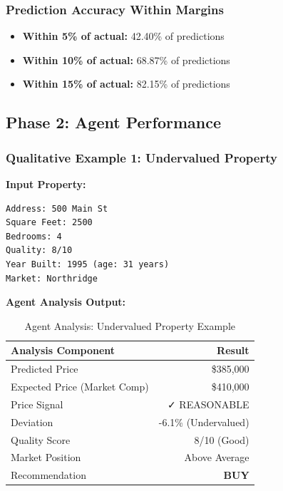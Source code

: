 \documentclass[11pt,a4paper]{article}
\begin{document}
\subsubsection{Prediction Accuracy Within Margins}

\begin{itemize}
    \item \textbf{Within 5\% of actual:} 42.40\% of predictions
    \item \textbf{Within 10\% of actual:} 68.87\% of predictions
    \item \textbf{Within 15\% of actual:} 82.15\% of predictions
\end{itemize}

\subsection{Phase 2: Agent Performance}

\subsubsection{Qualitative Example 1: Undervalued Property}

\textbf{Input Property:}
\begin{lstlisting}
Address: 500 Main St
Square Feet: 2500
Bedrooms: 4
Quality: 8/10
Year Built: 1995 (age: 31 years)
Market: Northridge
\end{lstlisting}

\textbf{Agent Analysis Output:}

\begin{table}[h!]
    \centering
    \small
    \begin{tabular}{lr}
        \toprule
        \textbf{Analysis Component} & \textbf{Result} \\
        \midrule
        Predicted Price & \$385,000 \\
        Expected Price (Market Comp) & \$410,000 \\
        Price Signal & ✓ REASONABLE \\
        Deviation & -6.1\% (Undervalued) \\
        Quality Score & 8/10 (Good) \\
        Market Position & Above Average \\
        Recommendation & \textbf{BUY} \\
        \bottomrule
    \end{tabular}
    \caption{Agent Analysis: Undervalued Property Example}
\end{table}
\end{document}
